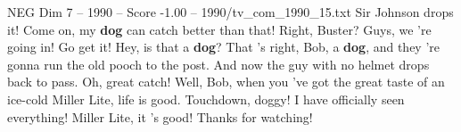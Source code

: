 \begin{textsample}{NEG Dim 7 – 1990 – Score -1.00 – 1990/tv\_com\_1990\_15.txt}  \label{ex:f7_neg_030}
Sir Johnson drops it!
Come on, my \textbf{dog} can catch better than that!
Right, Buster?
Guys, we 're going in!
Go get it!
Hey, is that a \textbf{dog}?
That 's right, Bob, a \textbf{dog}, and they 're gonna run the old pooch to the post.
And now the guy with no helmet drops back to pass.
Oh, great catch!
Well, Bob, when you 've got the great taste of an ice-cold Miller Lite, life is good.
Touchdown, doggy!
I have officially seen everything!
Miller Lite, it 's good!
Thanks for watching!

\end{textsample}
